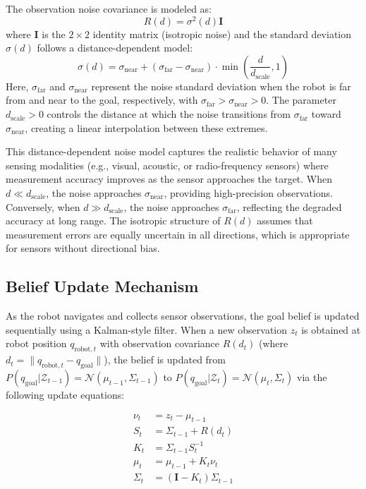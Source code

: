 The observation noise covariance is modeled as:
\begin{equation}
    R(d) = \sigma^2(d) \mathbf{I}
\end{equation}
where $\mathbf{I}$ is the $2 \times 2$ identity matrix (isotropic noise) and the standard deviation $\sigma(d)$ follows a distance-dependent model:
\begin{equation}
    \sigma(d) = \sigma_{\text{near}} + (\sigma_{\text{far}} - \sigma_{\text{near}}) \cdot \min\left(\frac{d}{d_{\text{scale}}}, 1\right)
\end{equation}
Here, $\sigma_{\text{far}}$ and $\sigma_{\text{near}}$ represent the noise standard deviation when the robot is far from and near to the goal, respectively, with $\sigma_{\text{far}} > \sigma_{\text{near}} > 0$. The parameter $d_{\text{scale}} > 0$ controls the distance at which the noise transitions from $\sigma_{\text{far}}$ toward $\sigma_{\text{near}}$, creating a linear interpolation between these extremes.

This distance-dependent noise model captures the realistic behavior of many sensing modalities (e.g., visual, acoustic, or radio-frequency sensors) where measurement accuracy improves as the sensor approaches the target. When $d \ll d_{\text{scale}}$, the noise approaches $\sigma_{\text{near}}$, providing high-precision observations. Conversely, when $d \gg d_{\text{scale}}$, the noise approaches $\sigma_{\text{far}}$, reflecting the degraded accuracy at long range. The isotropic structure of $R(d)$ assumes that measurement errors are equally uncertain in all directions, which is appropriate for sensors without directional bias.

\subsection{Belief Update Mechanism}

As the robot navigates and collects sensor observations, the goal belief is updated sequentially using a Kalman-style filter. When a new observation $z_t$ is obtained at robot position $q_{\text{robot},t}$ with observation covariance $R(d_t)$ (where $d_t = \|q_{\text{robot},t} - q_{\text{goal}}\|$), the belief is updated from $P(q_{\text{goal}} | \mathcal{Z}_{t-1}) = \mathcal{N}(\mu_{t-1}, \Sigma_{t-1})$ to $P(q_{\text{goal}} | \mathcal{Z}_t) = \mathcal{N}(\mu_t, \Sigma_t)$ via the following update equations:

\begin{align}
    \nu_t &= z_t - \mu_{t-1} \label{eq:innovation} \\
    S_t &= \Sigma_{t-1} + R(d_t) \label{eq:innovation_cov} \\
    K_t &= \Sigma_{t-1} S_t^{-1} \label{eq:kalman_gain} \\
    \mu_t &= \mu_{t-1} + K_t \nu_t \label{eq:mean_update} \\
    \Sigma_t &= (\mathbf{I} - K_t) \Sigma_{t-1} \label{eq:cov_update}
\end{align}

